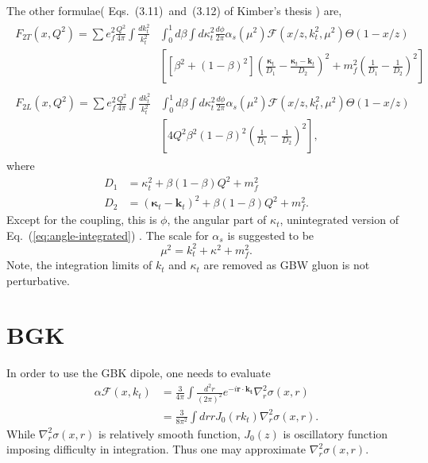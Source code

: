 \documentclass[12pt]{article}
\begin{document}
The other formulae( %
Eqs.~(3.11)~and~(3.12) of Kimber's thesis ) are,
\begin{align}
\begin{split}
F_{2T}(x,Q^2)=\sum e^2_f\frac{Q^2}{4\pi}\int\frac{d k_t^2}{k_t^2}&\int^1_0 d\beta\int d \kappa_t ^2 \frac{d\phi}{2\pi}\alpha_s(\mu^2)\mathcal{F}(x/z,k^2_t,\mu^2)\Theta(1-x/z)\\
&\left[
\left[\beta^2+(1-\beta)^2\right]
\left(\frac{\boldsymbol{\kappa}_t}{D_1}-\frac{\boldsymbol{\kappa}_t-\mathbf{k}_t}{D_2}\right)^2
+m_f^2\left(\frac{1}{D_1}-\frac{1}{D_2}\right)^2
\right]\label{eq:angle-unintegratedT}
\end{split}\\
\begin{split}
F_{2L}(x,Q^2)=\sum e^2_f\frac{Q^2}{4\pi}\int\frac{d k_t^2}{k_t^2}&\int^1_0 d\beta\int d \kappa_t ^2 \frac{d\phi}{2\pi}\alpha_s(\mu^2)\mathcal{F}(x/z,k^2_t,\mu^2)\Theta(1-x/z)\\
&\left[
4Q^2\beta^2 (1-\beta)^2\left(\frac{1}{D_1}-\frac{1}{D_2}\right)^2
\right],\label{eq:angle-unintegratedL}
\end{split}
\end{align}
where
\begin{equation}
\begin{split}
D_1&=\kappa_t^2+\beta(1-\beta)Q^2+m_f^2\\
D_2&=(\boldsymbol{\kappa}_t-\mathbf{k}_t)^2+\beta(1-\beta)Q^2+m_f^2.
\end{split}
\end{equation}
Except for the coupling, this is $\phi$,  the angular part of $\kappa_t$, unintegrated version of Eq.~(\ref{eq:angle-integrated}) .
The scale for $\alpha_s$ is suggested to be 
\begin{equation}
\mu^2=k^2_t+\kappa^2+m_f^2.
\label{eq:scale}
\end{equation}
Note, the integration limits of $k_t$ and $\kappa_t$ are removed as GBW gluon is not perturbative.
\section{BGK}
In order to use the GBK dipole, one needs to evaluate
\begin{equation}
\begin{split}
	\alpha \mathcal{F}(x,k_t)&=\frac{3}{4\pi}\int \frac{d^2r}{(2\pi)^2}e^{-i\mathbf{r}\cdot\mathbf{k_t}}\nabla^2_r\sigma(x,r)\\
&=\frac{3}{8\pi^2}\int dr r J_0(r k_t) \nabla^2_r\sigma(x,r).
\end{split}
\end{equation}
While $\nabla^2_r\sigma(x,r)$ is relatively smooth function, $J_0(z)$ is oscillatory function imposing difficulty in integration. Thus one may approximate  $\nabla^2_r\sigma(x,r)$.
\end{document}
